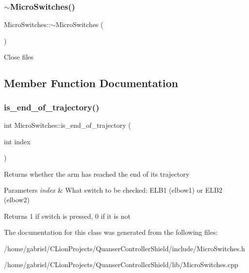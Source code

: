 \subsubsection{\texorpdfstring{$\sim$\+Micro\+Switches()}{~MicroSwitches()}}
{\footnotesize\ttfamily Micro\+Switches\+::$\sim$\+Micro\+Switches (\begin{DoxyParamCaption}{ }\end{DoxyParamCaption})\hspace{0.3cm}{\ttfamily [virtual]}}

Close files 

\subsection{Member Function Documentation}
\mbox{\label{classMicroSwitches_acff92bf7c9c16cc9c8e255dbf8ca5aaf}} 
\subsubsection{\texorpdfstring{is\+\_\+end\+\_\+of\+\_\+trajectory()}{is\_end\_of\_trajectory()}}
{\footnotesize\ttfamily int Micro\+Switches\+::is\+\_\+end\+\_\+of\+\_\+trajectory (\begin{DoxyParamCaption}\item[{int}]{index }\end{DoxyParamCaption})}

Returns whether the arm has reached the end of its trajectory 
\begin{DoxyParams}{Parameters}
{\em index} & What switch to be checked\+: E\+L\+B1 (elbow1) or E\+L\+B2 (elbow2) \\
\hline
\end{DoxyParams}
\begin{DoxyReturn}{Returns}
1 if switch is pressed, 0 if it is not 
\end{DoxyReturn}


The documentation for this class was generated from the following files\+:\begin{DoxyCompactItemize}
\item 
/home/gabriel/\+C\+Lion\+Projects/\+Quanser\+Controller\+Shield/include/Micro\+Switches.\+h\item 
/home/gabriel/\+C\+Lion\+Projects/\+Quanser\+Controller\+Shield/lib/Micro\+Switches.\+cpp\end{DoxyCompactItemize}
